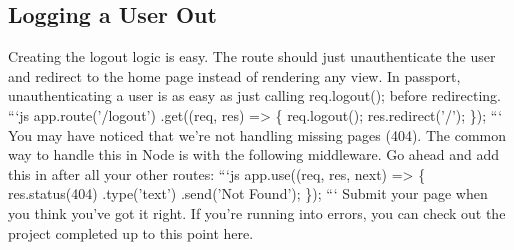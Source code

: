 \documentclass{article}%
\begin{document}
\subsection{Logging a User Out}%
\label{subsec:LoggingaUserOut}%
Creating the logout logic is easy. The route should just unauthenticate the user and redirect to the home page instead of rendering any view.\newline%
In passport, unauthenticating a user is as easy as just calling req.logout(); before redirecting.\newline%
```js\newline%
app.route('/logout')\newline%
  .get((req, res) => \{\newline%
    req.logout();\newline%
    res.redirect('/');\newline%
\});\newline%
```\newline%
You may have noticed that we're not handling missing pages (404). The common way to handle this in Node is with the following middleware. Go ahead and add this in after all your other routes:\newline%
```js\newline%
app.use((req, res, next) => \{\newline%
  res.status(404)\newline%
    .type('text')\newline%
    .send('Not Found');\newline%
\});\newline%
```\newline%
Submit your page when you think you've got it right. If you're running into errors, you can check out the project completed up to this point here.\newline%

%
\end{document}

